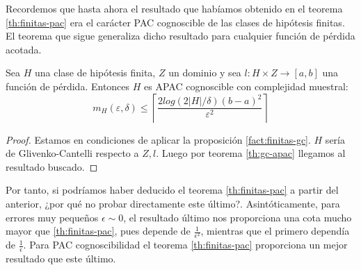 Recordemos que hasta ahora el resultado que habíamos obtenido en el teorema \ref{th:finitas-pac} 
era el carácter PAC cognoscible de las clases de hipótesis finitas. El teorema que sigue generaliza dicho resultado
para cualquier función de pérdida acotada.

\begin{corollary}
Sea $H$ una clase de hipótesis finita, $Z$ un dominio y sea $l : H \times Z \rightarrow [a,b]$ una
función de pérdida. Entonces $H$ es APAC cognoscible con complejidad muestral:
\[
  m_{H}( \varepsilon, \delta ) \le \left\lceil \frac{2 log(2|H|/\delta)(b-a)^2}{\varepsilon^2} \right\rceil
\]

\label{finitas-apac}
\end{corollary}
  
  \begin{proof}
  Estamos en condiciones de aplicar la proposición \ref{fact:finitas-gc}. $H$ sería de Glivenko-Cantelli 
  respecto a $Z,l$. Luego por teorema \ref{th:gc-apac} llegamos al resultado buscado.
  \end{proof}

Por tanto, si podríamos haber deducido el teorema \ref{th:finitas-pac} a partir del anterior, ¿por qué no probar
directamente este último?. Asintóticamente, para errores muy pequeños $\epsilon \sim 0$, el resultado último nos 
proporciona una cota mucho mayor que \ref{th:finitas-pac}, pues depende de $\frac{1}{\epsilon^2}$, mientras que el primero
dependía de $\frac{1}{\epsilon}$. Para PAC cognoscibilidad el teorema \ref{th:finitas-pac} proporciona un mejor
resultado que este último.